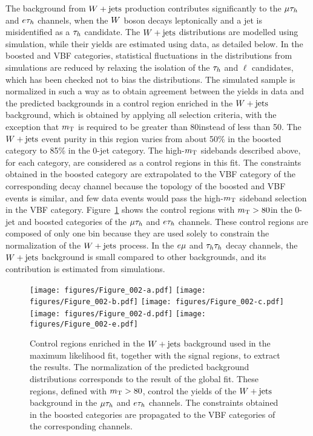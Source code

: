 The background from $W+\text{jets}$ production contributes significantly to the
$\mu\tau_{h}$ and $e\tau_{h}$ channels, when the $W$ boson decays leptonically and
a jet is misidentified as a $\tau_{h}$ candidate.
The $W+\text{jets}$ distributions are modelled using simulation, while their yields are estimated using data, as detailed below. In the boosted and VBF categories, statistical fluctuations in the distributions from simulations are reduced by relaxing the isolation of the $\tau_{h}$ and $\ell$ candidates, which has been checked not to bias the distributions.
The simulated sample is normalized in such a way as to obtain agreement between the yields in data and the predicted backgrounds in a control region enriched in the $W+\text{jets}$ background,
which is obtained by applying all selection criteria,
with the exception that $m_\mathrm{T}$ is required to be greater than 80\GeV instead of less than 50\GeV.
The $W+\text{jets}$ event purity in this
region varies from about 50\% in the boosted category to 85\% in the 0-jet category.
The high-$m_\mathrm{T}$ sidebands described above, for each category, are considered
as a control regions in this fit.
 The constraints obtained in the boosted category are extrapolated to the VBF category of the corresponding decay channel because
the topology of the boosted and VBF events is similar, and few data events would pass the high-$m_\mathrm{T}$ sideband selection in the VBF category. Figure~\ref{fig:CR1} shows the control regions with $m_\mathrm{T}>80$\GeV in the 0-jet and boosted categories of the $\mu\tau_{h}$ and $e\tau_{h}$ channels. These control regions are composed of only one bin because they are used solely to constrain the normalization of the $W+\text{jets}$ process.
In the $e\mu$ and $\tau_{h}\tau_{h}$ decay channels, the $W+\text{jets}$
background is small compared to other backgrounds, and its contribution is
estimated from simulations.

\begin{figure*}[!htbp]
\centering
     \texttt{[image: figures/Figure\_002-a.pdf]}
     \texttt{[image: figures/Figure\_002-b.pdf]}
     \texttt{[image: figures/Figure\_002-c.pdf]}
     \texttt{[image: figures/Figure\_002-d.pdf]}
     \texttt{[image: figures/Figure\_002-e.pdf]}
     \caption{Control regions enriched in the $W+\text{jets}$ background used in the maximum likelihood fit, together with the signal regions, to extract the results. The normalization of the predicted background distributions corresponds to the result of the global fit. These regions, defined with $m_\mathrm{T}>80$\GeV,  control the
yields of the $W+\text{jets}$ background in the $\mu\tau_{h}$ and $e\tau_{h}$ channels.  The constraints obtained in the boosted categories are propagated to the VBF categories of the corresponding channels.}
     \label{fig:CR1}
\end{figure*}


